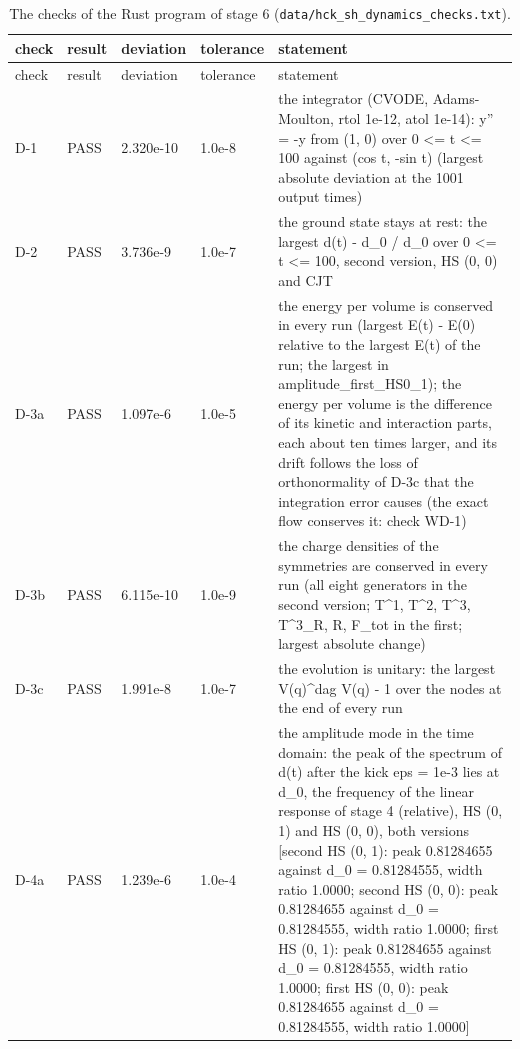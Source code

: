 \documentclass[aps,prd,onecolumn,superscriptaddress,nofootinbib,floatfix,longbibliography]{revtex4-2}
\begin{document}
\begingroup\fontsize{7}{8.5}\selectfont\setlength{\tabcolsep}{3pt}
\begin{longtable}{p{}p{}p{}p{}p{}}
\caption{\label{tab:checks_dynamics_rust}The checks of the Rust program of stage 6 (\texttt{data/hck\_sh\_dynamics\_checks.txt}).}\\
\hline\hline
check & result & deviation & tolerance & statement \\ \hline
\endfirsthead
\hline check & result & deviation & tolerance & statement \\ \hline
\endhead
\hline\hline
\endlastfoot
D-1 & PASS & 2.320e-10 & 1.0e-8 & the integrator (CVODE, Adams-Moulton, rtol 1e-12, atol 1e-14): y'' = -y from (1, 0) over 0 \textless{}= t \textless{}= 100 against (cos t, -sin t) (largest absolute deviation at the 1001 output times) \\
D-2 & PASS & 3.736e-9 & 1.0e-7 & the ground state stays at rest: the largest \textbar{}d(t) - d\_0\textbar{} / d\_0 over 0 \textless{}= t \textless{}= 100, second version, HS (0, 0) and CJT \\
D-3a & PASS & 1.097e-6 & 1.0e-5 & the energy per volume is conserved in every run (largest \textbar{}E(t) - E(0)\textbar{} relative to the largest \textbar{}E(t)\textbar{} of the run; the largest in amplitude\_first\_HS0\_1); the energy per volume is the difference of its kinetic and interaction parts, each about ten times larger, and its drift follows the loss of orthonormality of D-3c that the integration error causes (the exact flow conserves it: check WD-1) \\
D-3b & PASS & 6.115e-10 & 1.0e-9 & the charge densities of the symmetries are conserved in every run (all eight generators in the second version; T\textasciicircum{}1, T\textasciicircum{}2, T\textasciicircum{}3, T\textasciicircum{}3\_R, R, F\_tot in the first; largest absolute change) \\
D-3c & PASS & 1.991e-8 & 1.0e-7 & the evolution is unitary: the largest \textbar{}V(q)\textasciicircum{}dag V(q) - 1\textbar{} over the nodes at the end of every run \\
D-4a & PASS & 1.239e-6 & 1.0e-4 & the amplitude mode in the time domain: the peak of the spectrum of \textbar{}d(t)\textbar{} after the kick eps = 1e-3 lies at d\_0, the frequency of the linear response of stage 4 (relative), HS (0, 1) and HS (0, 0), both versions [second HS (0, 1): peak 0.81284655 against d\_0 = 0.81284555, width ratio 1.0000; second HS (0, 0): peak 0.81284655 against d\_0 = 0.81284555, width ratio 1.0000; first HS (0, 1): peak 0.81284655 against d\_0 = 0.81284555, width ratio 1.0000; first HS (0, 0): peak 0.81284655 against d\_0 = 0.81284555, width ratio 1.0000] \\

\end{longtable}
\end{document}
